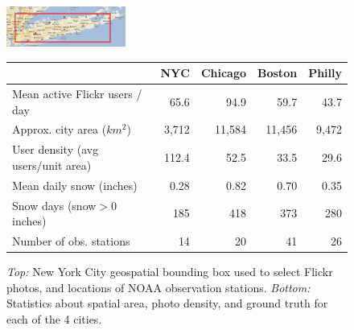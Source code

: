 \begin{figure}
\begin{center}
\includegraphics[width=0.35\textwidth]{plots/nyc_stations.png} 
\end{center}
\begin{center}
{\small{
\newcommand{\spc}{\hspace{2pt}}
{}
\begin{tabular}{@{\spc}l@{\spc}|@{\spc}r@{\spc}|@{\spc}r@{\spc}|@{\spc}r@{\spc}|@{\spc}r@{\spc}}\toprule
\textbf{} &{NYC}  &{Chicago} &{Boston}&{Philly} \\\midrule 
{Mean active Flickr users / day} &{65.6} &{94.9} &{59.7} &{43.7} \\
{Approx. city area ($km^2$)} &{3,712} &{11,584} &{11,456} &{9,472}  \\
{User density (avg users/unit area)} &{112.4} &{52.5} &{33.5} &{29.6} \\
{Mean daily snow (inches)} &{0.28} &{0.82} &{0.70} &{0.35} \\
{Snow days (snow$>$0 inches)} &{185} &{418} &{373} &{280} \\
{Number of obs. stations} &{14} &{20} &{41} &{26} \\
\bottomrule
\end{tabular}}}
\end{center}
\vspace{-12pt}
 \caption {\textit{Top:} New York City geospatial bounding box used to select Flickr photos, and locations of NOAA observation stations. \textit{Bottom:} Statistics about spatial area, photo density, and ground truth for each of the 4 cities.}
\label{tab:city_statistics} 
\end{figure}




